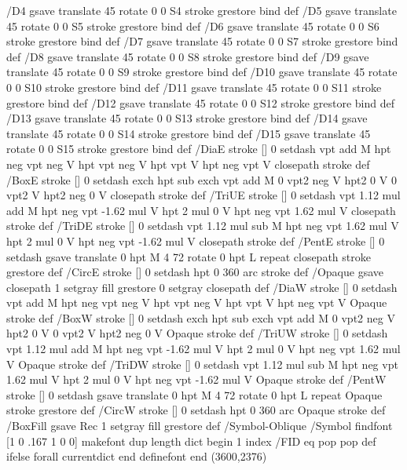 {{/D4 { gsave translate 45 rotate 0 0 S4 stroke grestore } bind def
/D5 { gsave translate 45 rotate 0 0 S5 stroke grestore } bind def
/D6 { gsave translate 45 rotate 0 0 S6 stroke grestore } bind def
/D7 { gsave translate 45 rotate 0 0 S7 stroke grestore } bind def
/D8 { gsave translate 45 rotate 0 0 S8 stroke grestore } bind def
/D9 { gsave translate 45 rotate 0 0 S9 stroke grestore } bind def
/D10 { gsave translate 45 rotate 0 0 S10 stroke grestore } bind def
/D11 { gsave translate 45 rotate 0 0 S11 stroke grestore } bind def
/D12 { gsave translate 45 rotate 0 0 S12 stroke grestore } bind def
/D13 { gsave translate 45 rotate 0 0 S13 stroke grestore } bind def
/D14 { gsave translate 45 rotate 0 0 S14 stroke grestore } bind def
/D15 { gsave translate 45 rotate 0 0 S15 stroke grestore } bind def
/DiaE { stroke [] 0 setdash vpt add M
  hpt neg vpt neg V hpt vpt neg V
  hpt vpt V hpt neg vpt V closepath stroke } def
/BoxE { stroke [] 0 setdash exch hpt sub exch vpt add M
  0 vpt2 neg V hpt2 0 V 0 vpt2 V
  hpt2 neg 0 V closepath stroke } def
/TriUE { stroke [] 0 setdash vpt 1.12 mul add M
  hpt neg vpt -1.62 mul V
  hpt 2 mul 0 V
  hpt neg vpt 1.62 mul V closepath stroke } def
/TriDE { stroke [] 0 setdash vpt 1.12 mul sub M
  hpt neg vpt 1.62 mul V
  hpt 2 mul 0 V
  hpt neg vpt -1.62 mul V closepath stroke } def
/PentE { stroke [] 0 setdash gsave
  translate 0 hpt M 4 {72 rotate 0 hpt L} repeat
  closepath stroke grestore } def
/CircE { stroke [] 0 setdash 
  hpt 0 360 arc stroke } def
/Opaque { gsave closepath 1 setgray fill grestore 0 setgray closepath } def
/DiaW { stroke [] 0 setdash vpt add M
  hpt neg vpt neg V hpt vpt neg V
  hpt vpt V hpt neg vpt V Opaque stroke } def
/BoxW { stroke [] 0 setdash exch hpt sub exch vpt add M
  0 vpt2 neg V hpt2 0 V 0 vpt2 V
  hpt2 neg 0 V Opaque stroke } def
/TriUW { stroke [] 0 setdash vpt 1.12 mul add M
  hpt neg vpt -1.62 mul V
  hpt 2 mul 0 V
  hpt neg vpt 1.62 mul V Opaque stroke } def
/TriDW { stroke [] 0 setdash vpt 1.12 mul sub M
  hpt neg vpt 1.62 mul V
  hpt 2 mul 0 V
  hpt neg vpt -1.62 mul V Opaque stroke } def
/PentW { stroke [] 0 setdash gsave
  translate 0 hpt M 4 {72 rotate 0 hpt L} repeat
  Opaque stroke grestore } def
/CircW { stroke [] 0 setdash 
  hpt 0 360 arc Opaque stroke } def
/BoxFill { gsave Rec 1 setgray fill grestore } def
/Symbol-Oblique /Symbol findfont [1 0 .167 1 0 0] makefont
dup length dict begin {1 index /FID eq {pop pop} {def} ifelse} forall
currentdict end definefont
end
}}%
\GNUPLOTpicture(3600,2376)
